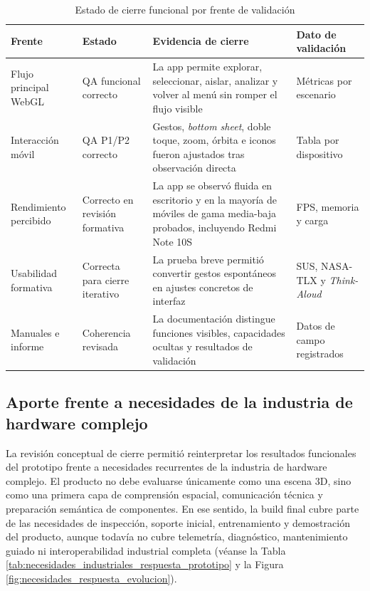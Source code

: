 \begin{table}[p]
    \caption{Estado de cierre funcional por frente de validación}
    \label{tab:estado_cierre_funcional}
    \centering
    \footnotesize
    \setlength{\tabcolsep}{3pt}
    \renewcommand{\arraystretch}{0.8}
    \begin{tabular}{>{\RaggedRight\arraybackslash}p{3.15cm}>{\RaggedRight\arraybackslash}p{3.05cm}>{\RaggedRight\arraybackslash}p{5.05cm}>{\RaggedRight\arraybackslash}p{2.45cm}}
        \hline
        \textbf{Frente} & \textbf{Estado} & \textbf{Evidencia de cierre} & \textbf{Dato de validación} \\ \hline
        Flujo principal WebGL & QA funcional correcto & La app permite explorar, seleccionar, aislar, analizar y volver al menú sin romper el flujo visible & Métricas por escenario \\
        Interacción móvil & QA P1/P2 correcto & Gestos, \textit{bottom sheet}, doble toque, zoom, órbita e iconos fueron ajustados tras observación directa & Tabla por dispositivo \\
        Rendimiento percibido & Correcto en revisión formativa & La app se observó fluida en escritorio y en la mayoría de móviles de gama media-baja probados, incluyendo Redmi Note 10S & FPS, memoria y carga \\
        Usabilidad formativa & Correcta para cierre iterativo & La prueba breve permitió convertir gestos espontáneos en ajustes concretos de interfaz & SUS, NASA-TLX y \textit{Think-Aloud} \\
        Manuales e informe & Coherencia revisada & La documentación distingue funciones visibles, capacidades ocultas y resultados de validación & Datos de campo registrados \\ \hline
    \end{tabular}
    \par\vspace{0.5\baselineskip}
\end{table}

\subsection{Aporte frente a necesidades de la industria de hardware complejo}

La revisión conceptual de cierre permitió reinterpretar los resultados funcionales del prototipo frente a necesidades recurrentes de la industria de hardware complejo. El producto no debe evaluarse únicamente como una escena 3D, sino como una primera capa de comprensión espacial, comunicación técnica y preparación semántica de componentes. En ese sentido, la build final cubre parte de las necesidades de inspección, soporte inicial, entrenamiento y demostración del producto, aunque todavía no cubre telemetría, diagnóstico, mantenimiento guiado ni interoperabilidad industrial completa (véanse la Tabla \ref{tab:necesidades_industriales_respuesta_prototipo} y la Figura \ref{fig:necesidades_respuesta_evolucion}).

